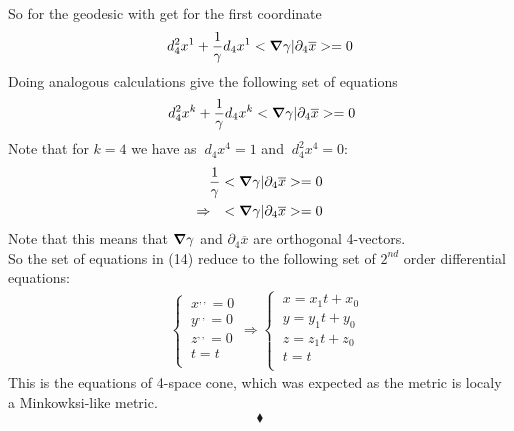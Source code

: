 So for the geodesic with get for the first coordinate $$d^2_4x^1+ \frac{1}{\gamma}d_4x^1 < \grad \gamma|\partial_4 \overline{x} > = 0 $$
Doing analogous calculations give the following set of equations
\begin{align}
\ d^2_4x^k+ \frac{1}{\gamma}d_4x^k < \grad \gamma|\partial_4 \overline{x} > = 0 
\end{align}
Note that for $k=4$ we have as $\ d_4x^4 = 1$ and $\ d^2_4x^4 = 0$:
\begin{align}
 \frac{1}{\gamma}< \grad \gamma|\partial_4 \overline{x} > = 0 \\
 \Rightarrow \quad < \grad \gamma|\partial_4 \overline{x} > = 0 
\end{align}
Note that this means that $\grad \gamma$ and $\partial_4 \overline{x}$ are orthogonal 4-vectors.\\
So the set of equations in (14) reduce to the following set of $2^{nd}$ order differential equations:
\begin{align}
\ & \left  \{ \begin{array}{l}
\ x^{,,} = 0\\
\ y^{,,} = 0\\
\ z^{,,} = 0\\
\ t = t\\
\end{array} \right.
\Rightarrow  \left  \{ \begin{array}{l}
\ x = x_1t+x_0\\
\ y =y_1t+y_0\\
\ z = z_1t+z_0\\
\ t = t\\
\end{array} \right.
\end{align}
This is the equations of 4-space cone, which was expected as the metric is localy a Minkowksi-like metric. 
$$\blacklozenge$$
\newpage

